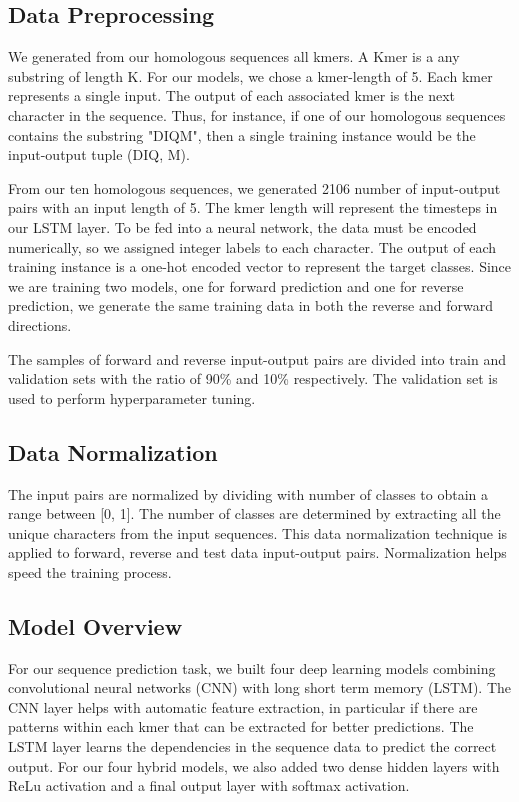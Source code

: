 \documentclass[journal]{IEEEtran}
\begin{document}
  \subsection{Data Preprocessing}
  We generated from our homologous sequences all kmers. A Kmer is a any substring of length K. For our models, we chose a
  kmer-length of 5. Each kmer represents a single input. The output of each associated kmer is the next character in the sequence.
  Thus, for instance, if one of our homologous sequences contains the substring "DIQM", then a single training instance would be
  the input-output tuple (DIQ, M).

  From our ten homologous sequences, we generated 2106 number of input-output pairs with an input length of 5.
  The kmer length will represent the timesteps in our LSTM layer.
  To be fed into a neural network, the data must be encoded numerically, so we assigned integer labels to each character.
  The output of each training instance is a
  one-hot encoded vector to represent the target classes. Since we are training two models, one for forward prediction
  and one for reverse prediction, we generate the same training data in both the reverse and forward directions.

  The samples of forward and reverse input-output pairs are divided into train and validation sets with the ratio of
  90\% and 10\% respectively. The validation set is used to perform hyperparameter tuning.

\subsection{Data Normalization}
    The input pairs are normalized by dividing with number of classes to obtain a range between [0, 1].
    The number of classes are determined by extracting all the unique characters from the input sequences.
    This data normalization technique is applied to forward, reverse and test data input-output pairs.
    Normalization helps speed the training process.

  \subsection{Model Overview}

    For our sequence prediction task, we built four deep learning models combining convolutional neural
    networks (CNN) with long short term memory (LSTM). The CNN layer helps with automatic feature extraction, in particular
    if there are patterns within each kmer that can be extracted for better predictions. The LSTM layer learns
    the dependencies in the sequence data to predict the correct output. For our four hybrid models, we also
    added two dense hidden layers with ReLu activation and a final output layer with softmax activation.
\end{document}
